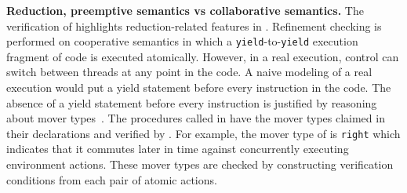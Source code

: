{\bf Reduction, preemptive semantics vs collaborative semantics.}
The verification of  highlights reduction-related features
in \civl. 
Refinement checking is performed on cooperative semantics in which a 
{\tt yield}-to-{\tt yield} execution fragment of code is executed atomically.
However, in a real execution, control can switch between threads at any point in the code. 
A naive modeling of a real execution would put a yield statement before every instruction in the code.
The absence of a yield statement before every instruction is justified by reasoning about mover types~\cite{FlanaganFLQ08}. 
The procedures called in  have the mover types claimed in their
declarations and verified by \civl. 
For example, the mover type of  is {\tt right} which indicates 
that it commutes later in time against concurrently executing environment actions.
These mover types are checked by constructing verification conditions from each pair of atomic actions.

